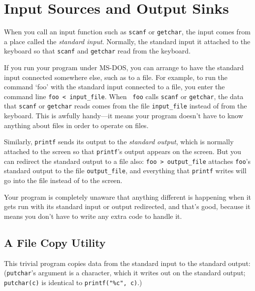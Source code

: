 \section{Input Sources and Output Sinks}

When you call an input function such as {\tt scanf} or {\tt getchar},
the input comes from a place called the {\em standard input}.  Normally,
the standard input it attached to the keyboard so that {\tt scanf} and
{\tt getchar} read from the keyboard.  

If you run your program under MS-DOS, you can arrange to have the
standard input connected somewhere else, such as to a file.  For
example, to run the command `foo' with the standard input connected to a
file, you enter the command line {\tt foo < input\_file}.  When {\tt
foo} calls {\tt scanf} or {\tt getchar}, the data that {\tt scanf} or
{\tt getchar} reads comes from the file {\tt input\_file} instead of
from the keyboard.  This is awfully handy---it means your program
doesn't have to know anything about files in order to operate on files.

Similarly, {\tt printf} sends its output to the {\em standard output}\/,
which is normally attached to the screen so that {\tt printf}'s output
appears on the screen.  But you can redirect the standard output to a
file also: {\tt foo > output\_file} attaches {\tt foo}'s standard output
to the file {\tt output\_file}, and everything that {\tt printf} writes
will go into the file instead of to the screen.

Your program is completely unaware that anything different is
happening when it gets run with its standard input or output redirected,
and that's good, because it means you don't have to write any extra code
to handle it.

\subsection{A File Copy Utility}

This trivial program copies data from the standard input to the standard
output: ({\tt putchar}'s argument is a character, which it writes out on
the standard output; {\tt putchar(c)} is identical to {\tt printf("\%c",
c)}.)

\begin{flushleft}
\verb% #include <stdio.h>% \\*
\verb% % \\*
\verb% int main(void)% \\*
\verb% { % \\*
\verb%   int c;% \\*
\verb% % \\*
\verb%   while ((c = getchar()) != EOF)% \\*
\verb%     putchar(c);% \\*
\verb%   return 0;% \\*
\verb% }% \\*
\end{flushleft}

